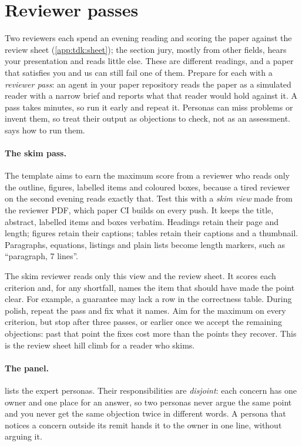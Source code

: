 \section{Reviewer passes}\label{app:lifecycle:reviewers}
Two reviewers each spend an evening reading and scoring the paper against the review sheet (\cref{app:tdk:sheet}); the section jury, mostly from other fields, hears your presentation and reads little else. These are different readings, and a paper that satisfies you and us can still fail one of them. Prepare for each with a \emph{reviewer pass}: an agent in your paper repository reads the paper as a simulated reader with a narrow brief and reports what that reader would hold against it. A pass takes minutes, so run it early and repeat it. Personas can miss problems or invent them, so treat their output as objections to check, not as an assessment.  says how to run them.

\paragraph{The skim pass.} The template aims to earn the maximum score from a reviewer who reads only the outline, figures, labelled items and coloured boxes, because a tired reviewer on the second evening reads exactly that. Test this with a \emph{skim view} made from the reviewer PDF, which paper CI builds on every push. It keeps the title, abstract, labelled items and boxes verbatim. Headings retain their page and length; figures retain their captions; tables retain their captions and a thumbnail. Paragraphs, equations, listings and plain lists become length markers, such as \enquote{paragraph, 7 lines}.

The skim reviewer reads only this view and the review sheet. It scores each criterion and, for any shortfall, names the item that should have made the point clear. For example, a guarantee may lack a row in the correctness table. During polish, repeat the pass and fix what it names. Aim for the maximum on every criterion, but stop after three passes, or earlier once we accept the remaining objections: past that point the fixes cost more than the points they recover. This is the review sheet hill climb for a reader who skims.

\paragraph{The panel.}  lists the expert personas. Their responsibilities are \emph{disjoint}: each concern has one owner and one place for an answer, so two personas never argue the same point and you never get the same objection twice in different words. A persona that notices a concern outside its remit hands it to the owner in one line, without arguing it.

